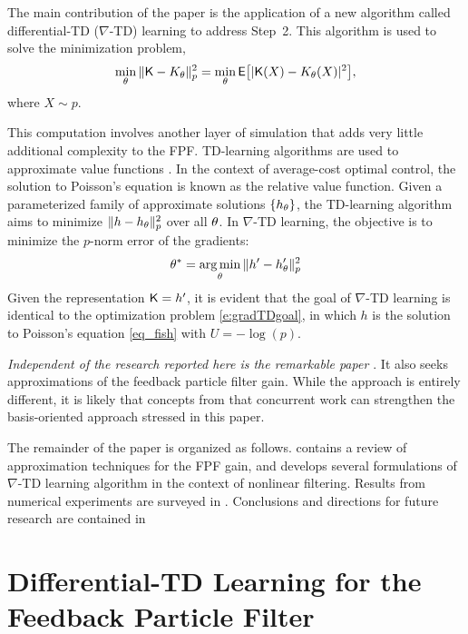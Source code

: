 The main contribution of the paper is the application of a new algorithm called differential-TD ($\nabla$-TD) learning to address Step~2.   This algorithm is used to solve the minimization problem,
\begin{equation}
\min_{\param}\|\kFPF - K_\param\|_p^{2}
=
\min_{\param} \Expect\bigl[   | \kFPF (X) - K_\param(X) |^2 \bigr],
\label{e:gradTDgoal}
\end{equation}
where $X \sim p$.

This computation involves another layer of simulation that adds very little additional complexity to the FPF. 
TD-learning algorithms are used to approximate value functions \cite{bertsi96a}.  In the context of average-cost optimal control,  the solution to Poisson's equation is known as the relative value function.   Given a parameterized family of approximate solutions $\{h_\theta\}$,  the TD-learning algorithm aims to minimize $\| h - h_\theta\|_p^{2}$ over all $\theta$. In $\nabla$-TD learning, the objective is to minimize the $p$-norm error of the gradients:
\begin{equation}
\param^* = \argmin_{\param} \| h' - h_\param'\|_p^{2}
\label{e:gradTDobjective}
\end{equation}
Given the representation $\text{\sf K} = h' $,  it is evident that the goal of $\nabla$-TD learning
is identical to the optimization problem \eqref{e:gradTDgoal}, in which $h$ is the solution to Poisson's equation \eqref{eq_fish} with $U=-\log(p)$.



\textit{Independent of the research reported here is the remarkable paper \cite{tagmeh16}}.  It also seeks approximations of the  feedback particle filter gain. While the approach is entirely different,   it is likely that concepts from that concurrent work can strengthen the basis-oriented approach stressed in this paper.  



The remainder of the paper is organized as follows.     contains a review of approximation techniques for the FPF gain,  and develops several formulations of  $\nabla$-TD learning algorithm in the context of nonlinear filtering.   Results from numerical experiments are surveyed in .    Conclusions and directions for future research are contained in 


\section{Differential-TD Learning for the Feedback Particle Filter}
\label{section_learning}

